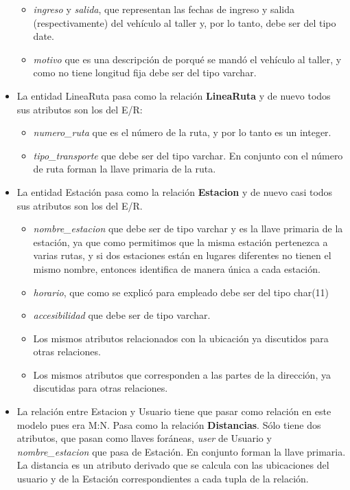 \documentclass[11pt]{article}
\begin{document}
\begin{itemize}
\begin{itemize}
        \item \textit{ingreso} y \textit{salida}, que representan las fechas de ingreso y salida (respectivamente) del vehículo al taller y, por lo tanto, debe ser del tipo date.
        \item \textit{motivo} que es una descripción de porqué se mandó el vehículo al taller, y como no tiene longitud fija debe ser del tipo varchar.
    \end{itemize}
\item La entidad LineaRuta pasa como la relación \textbf{LineaRuta} y de nuevo todos sus atributos son los del E/R:
    \begin{itemize}
        \item \textit{numero\_ruta} que es el número de la ruta, y por lo tanto es un integer.
        \item \textit{tipo\_transporte} que debe ser del tipo varchar. En conjunto con el número de ruta forman la llave primaria de la ruta.
    \end{itemize}
\item La entidad Estación pasa como la relación \textbf{Estacion} y de nuevo casi todos sus atributos son los del E/R.
    \begin{itemize}
        \item \textit{nombre\_estacion} que debe ser de tipo varchar y es la llave primaria de la estación, ya que como permitimos que la misma estación pertenezca a varias rutas, y si dos estaciones están en lugares diferentes no tienen el mismo nombre, entonces identifica de manera única a cada estación.
        \item \textit{horario}, que como se explicó para empleado debe ser del tipo char(11)
        \item \textit{accesibilidad} que debe ser de tipo varchar.
        \item Los mismos atributos relacionados con la ubicación ya discutidos para otras relaciones.
        \item Los mismos atributos que corresponden a las partes de la dirección, ya discutidas para otras relaciones.
    \end{itemize}
\item La relación entre Estacion y Usuario tiene que pasar como relación en este modelo pues era M:N. Pasa como la relación \textbf{Distancias}. Sólo tiene dos atributos, que pasan como llaves foráneas, \textit{user} de Usuario y \textit{nombre\_estacion} que pasa de Estación. En conjunto forman la llave primaria. La distancia es un atributo derivado que se calcula con las ubicaciones del usuario y de la Estación correspondientes a cada tupla de la relación.

\end{itemize}
\end{document}
